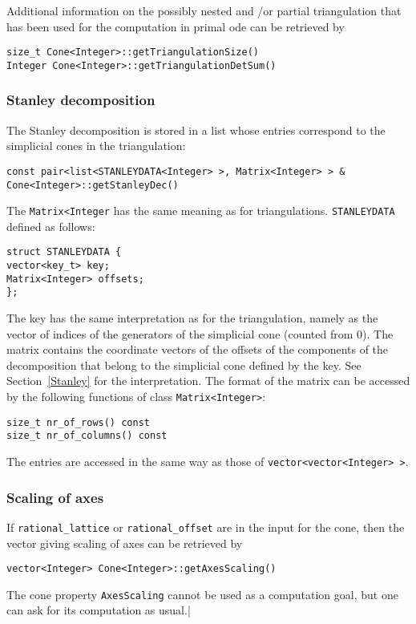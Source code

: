\begin{small}
Additional information on the possibly nested and /or partial triangulation that has been used for the computation in primal ode can be retrieved by
\begin{Verbatim}
size_t Cone<Integer>::getTriangulationSize()
Integer Cone<Integer>::getTriangulationDetSum() 
\end{Verbatim}

\subsubsection{Stanley decomposition}

The Stanley decomposition is stored in a list whose entries correspond to the simplicial cones in the triangulation:
\begin{Verbatim}
const pair<list<STANLEYDATA<Integer> >, Matrix<Integer> > &  Cone<Integer>::getStanleyDec()
\end{Verbatim}
The \verb|Matrix<Integer| has the same meaning as for triangulations.
\verb|STANLEYDATA| defined as follows:
\begin{Verbatim}
struct STANLEYDATA {
vector<key_t> key;
Matrix<Integer> offsets;
};
\end{Verbatim}
The key has the same interpretation as for the triangulation, namely as the vector of indices of the generators of the simplicial cone (counted from $0$). The matrix contains the coordinate vectors of the offsets of the components of the decomposition that belong to the simplicial cone defined by the key. See Section~\ref{Stanley} for the interpretation. The format of the matrix can be accessed by the following functions of class \verb|Matrix<Integer>|:
\begin{Verbatim}
size_t nr_of_rows() const
size_t nr_of_columns() const
\end{Verbatim}
The entries are accessed in the same way as those of \verb|vector<vector<Integer> >|.

\subsubsection{Scaling of axes}

If \verb|rational_lattice| or \verb|rational_offset| are in the input for the cone, then the vector giving scaling of axes can be retrieved by
\begin{Verbatim}
vector<Integer> Cone<Integer>::getAxesScaling() 
\end{Verbatim}
The cone property \verb|AxesScaling| cannot be used as a computation goal, but one can ask for its computation as usual.|


\end{small}
